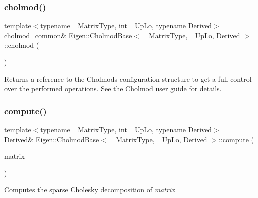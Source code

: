 \subsubsection{\texorpdfstring{cholmod()}{cholmod()}}
{\footnotesize\ttfamily template$<$typename \+\_\+\+Matrix\+Type, int \+\_\+\+Up\+Lo, typename Derived$>$ \\
cholmod\+\_\+common\& \mbox{\hyperlink{class_eigen_1_1_cholmod_base}{Eigen\+::\+Cholmod\+Base}}$<$ \+\_\+\+Matrix\+Type, \+\_\+\+Up\+Lo, Derived $>$\+::cholmod (\begin{DoxyParamCaption}{ }\end{DoxyParamCaption})\hspace{0.3cm}{\ttfamily [inline]}}

Returns a reference to the Cholmod\textquotesingle{}s configuration structure to get a full control over the performed operations. See the Cholmod user guide for details. \mbox{\label{class_eigen_1_1_cholmod_base_abaf5be01b1e3035a4de0b19f5b63549e}} 
\subsubsection{\texorpdfstring{compute()}{compute()}}
{\footnotesize\ttfamily template$<$typename \+\_\+\+Matrix\+Type, int \+\_\+\+Up\+Lo, typename Derived$>$ \\
Derived\& \mbox{\hyperlink{class_eigen_1_1_cholmod_base}{Eigen\+::\+Cholmod\+Base}}$<$ \+\_\+\+Matrix\+Type, \+\_\+\+Up\+Lo, Derived $>$\+::compute (\begin{DoxyParamCaption}\item[{const Matrix\+Type \&}]{matrix }\end{DoxyParamCaption})\hspace{0.3cm}{\ttfamily [inline]}}

Computes the sparse Cholesky decomposition of {\itshape matrix} \mbox{\label{class_eigen_1_1_cholmod_base_ab4ffb4a9735ad7e81a01d5789ce96547}} 
